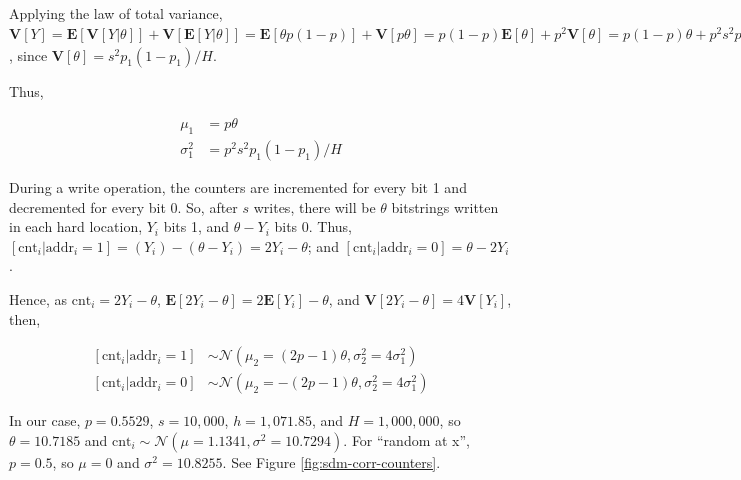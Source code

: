 \documentclass[12pt]{article}
\begin{document}
Applying the law of total variance, $\mathbf{V}[Y] = \mathbf{E}[\mathbf{V}[Y|\theta]] + \mathbf{V}[\mathbf{E}[Y|\theta]] = \mathbf{E}[\theta p (1-p)] + \mathbf{V}[p \theta] = p(1-p) \mathbf{E}[\theta] + p^2 \mathbf{V}[\theta] = p(1-p) \theta + p^2 s^2 p_1 (1-p_1)/H$, since $\mathbf{V}[\theta] = s^2 p_1 (1-p_1)/H$.

Thus,

\begin{align}
\mu_1 &= p \theta \\
\sigma_1^2 &= p^2 s^2 p_1 (1 - p_1) / H
\end{align}

During a write operation, the counters are incremented for every bit 1 and decremented for every bit 0. So, after $s$ writes, there will be $\theta$ bitstrings written in each hard location, $Y_i$ bits 1, and $\theta - Y_i$ bits 0. Thus, $[\text{cnt}_i | \text{addr}_i = 1] = (Y_i) - (\theta - Y_i) = 2Y_i - \theta$; and $[\text{cnt}_i | \text{addr}_i = 0] = \theta - 2Y_i$.

Hence, as $\text{cnt}_i = 2Y_i - \theta$, $\mathbf{E}[2Y_i - \theta] = 2 \mathbf{E}[Y_i] - \theta$, and $\mathbf{V}[2Y_i - \theta] = 4 \mathbf{V}[Y_i]$, then,

\begin{align}
\left[ \text{cnt}_i | \text{addr}_i=1 \right] &\sim \mathcal{N}(\mu_2 = (2p-1) \theta, \sigma_2^2 = 4 \sigma_1^2)\label{cntaddr1} \\
\left[ \text{cnt}_i | \text{addr}_i=0 \right] &\sim \mathcal{N}(\mu_2 = -(2p-1) \theta, \sigma_2^2 = 4 \sigma_1^2)\label{cntaddr0}
\end{align}

In our case, $p=0.5529$, $s=10,000$, $h=1,071.85$, and $H=1,000,000$, so $\theta = 10.7185$ and $\text{cnt}_i \sim \mathcal{N}(\mu=1.1341, \sigma^2 = 10.7294)$. For ``random at x'', $p=0.5$, so $\mu = 0$ and $\sigma^2 = 10.8255$. See Figure \ref{fig:sdm-corr-counters}.
\end{document}
